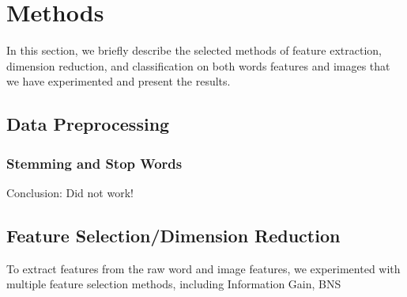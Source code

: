 \section{Methods}
In this section, we briefly describe the selected methods of feature extraction, dimension reduction, and classification on both words features and images that we have experimented and present the results. 

\subsection{Data Preprocessing}
\subsubsection{Stemming and Stop Words}
Conclusion: Did not work!

\subsection{Feature Selection/Dimension Reduction}
To extract features from the raw word and image features, we experimented with multiple feature selection methods, including Information Gain, BNS
